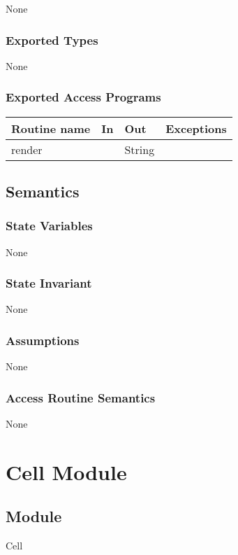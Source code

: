 \documentclass[12pt]{article}
\begin{document}
None

\subsubsection* {Exported Types}

None

\subsubsection* {Exported Access Programs}

\begin{tabular}{| l | l | l | p{5cm} |}
\hline
\textbf{Routine name} & \textbf{In} & \textbf{Out} & \textbf{Exceptions}\\
\hline
render &   & String & \\
\hline
\end{tabular}

\subsection* {Semantics}

\subsubsection* {State Variables}

None

\subsubsection* {State Invariant}

None

\subsubsection* {Assumptions}

None

\subsubsection* {Access Routine Semantics}

None

\newpage

%

\section*{Cell Module}
\subsection* {Module}
Cell
\end{document}
